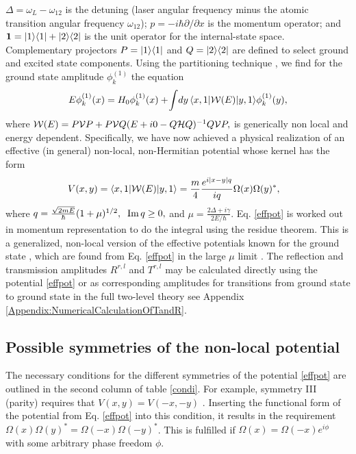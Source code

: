 $\Delta=\omega_{L}-\omega_{12}$
is the detuning (laser angular frequency minus the atomic transition
angular frequency $\omega_{12}$);
${p}=-i\hbar\partial/\partial x$ is the momentum operator;
and ${\bf 1}=|1\rangle\langle 1|+|2\rangle\langle 2|$ is the unit operator
for the internal-state space.
Complementary projectors
%
$P=|1\rangle\langle 1|$ and $Q=|2\rangle\langle 2|$
%
are defined to select ground and excited state components.
Using the partitioning
technique \cite{Feshbach1958,Feshbach1962,Levine1969},
we find for the ground
state amplitude $\phi_k^{(1)}$ the equation
%
\begin{equation}\label{effecti}
	E\phi_k^{(1)}(x) = H_0\phi_k^{(1)}(x)+\!
	\int\! dy\, \la x,1|{\cal W}(E)|y,1\ra \phi_k^{(1)}(y),
\end{equation}
%
where
%
$
{\cal W}(E)=P{\cal V}P+P{\cal V}Q(E+i0-Q{\cal H}Q)^{-1}Q{\cal V}P,
$
%
is generically non local and energy dependent. Specifically, we have now achieved
a physical realization of an effective (in general) non-local, non-Hermitian potential whose kernel has the form
%
\begin{eqnarray}
	\hspace*{-.3cm}V (x,y) = \la x,1|{\cal W}(E)|y,1\ra = \frac{m}{4} \frac{e^{i|x-y|q}}{i q}
	\Omega(x)\Omega(y)^*,
	\label{effpot}
\end{eqnarray}
%
%
where
$
q=\frac{\sqrt{2mE}}{\hbar}(1+\mu)^{1/2},\;\;
{\rm Im}\,q\ge 0,
\label{qeq}
$ and
$
\mu=\frac{2\Delta+i\gamma}{2E/\hbar}.
$
%
Eq. \eqref{effpot} is worked out  in momentum representation to do the integral
using the residue theorem.
This is a generalized, non-local version of the effective potentials known for the ground state
\cite{Chudesnikov1991,Oberthaler1996}, which are found from Eq. \eqref{effpot}  in the large $\mu$ limit \cite{Ruschhaupt2004a}.
The reflection and transmission amplitudes $R^{r,l}$ and  $T^{r,l}$ may be calculated directly
using  the potential  \eqref{effpot} or as  corresponding amplitudes for
transitions from ground state to ground state in the full two-level theory see Appendix \ref{Appendix:NumericalCalculationOfTandR}.


%
\subsection{Possible symmetries of the non-local potential}
%
The necessary conditions for the different symmetries of the potential \eqref{effpot} are outlined in the second column of  table \ref{condi}. For example,
symmetry III (parity) requires that $V(x,y)=V(-x,-y)$ \cite{Ruschhaupt2017}. Inserting the functional form of the potential from Eq. \eqref{effpot} into this condition, it results in the requirement $\Omega(x) \Omega(y)^* = \Omega(-x) \Omega(-y)^*$. This is fulfilled if $\Omega(x)=\Omega(-x)e^{i \phi}$ with some arbitrary phase freedom $\phi$.

